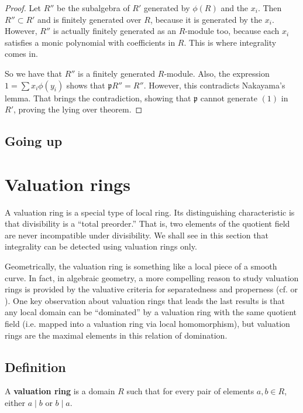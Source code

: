 \begin{proof}
Let $R''$ be the subalgebra of $R'$ generated by $\phi(R)$ and the $x_i$. Then
$R'' \subset R'$ and is finitely generated over $R$, because it is generated by
the $x_i$. However, $R''$ is actually finitely generated as an $R$-module too,
because each $x_i$ satisfies a monic polynomial with coefficients in $R$. This
is where integrality comes in.

So we have that $R''$ is a finitely generated $R$-module. Also, the expression
$1 = \sum x_i \phi(y_i)$ shows that $\mathfrak{p}R'' = R''$. However, this
contradicts Nakayama's lemma. That brings the contradiction, showing that
$\mathfrak{p}$ cannot generate $(1)$ in $R'$, proving the lying over theorem.

\end{proof}

\subsection{Going up}




\section{Valuation rings}

A valuation ring is a special type of local ring. Its distinguishing
characteristic is that divisibility is a ``total preorder.'' That is, two
elements of the quotient field are never incompatible under divisibility.
 We shall see in this section that integrality can be detected using
valuation rings only.

Geometrically, the valuation ring is something like a local piece of a smooth
curve. In fact, in algebraic geometry, a more compelling reason to study
valuation rings is provided by the valuative criteria for separatedness and
properness (cf. \cite{EGA} or \cite{Ha77}).  One key observation about
valuation rings that leads the last results is that any local domain can be
``dominated'' by a valuation ring with the same quotient field (i.e. mapped
into a valuation ring via local
homomorphism), but valuation rings are the maximal elements in this relation
of domination.

\subsection{Definition}

\begin{definition}
A \textbf{valuation ring} is a domain $R$ such that for every pair of elements
$a,b \in R$, either $a \mid b$ or $b \mid a$.
\end{definition}


